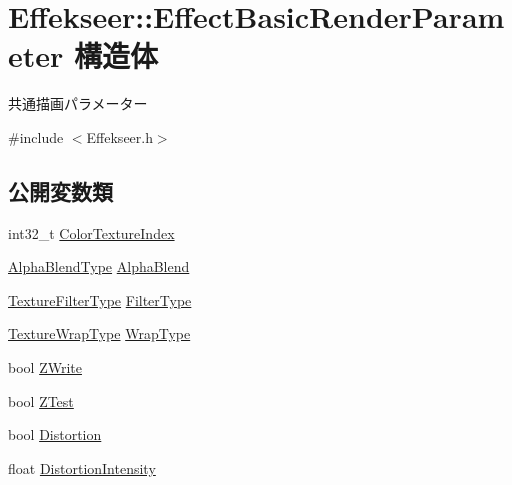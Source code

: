 \hypertarget{struct_effekseer_1_1_effect_basic_render_parameter}{}\section{Effekseer\+:\+:Effect\+Basic\+Render\+Parameter 構造体}
\label{struct_effekseer_1_1_effect_basic_render_parameter}


共通描画パラメーター  




{\ttfamily \#include $<$Effekseer.\+h$>$}

\subsection*{公開変数類}
\begin{DoxyCompactItemize}
\item 
int32\+\_\+t \mbox{\hyperlink{struct_effekseer_1_1_effect_basic_render_parameter_a28d3845ddf7e5255f5c6246ef001c265}{Color\+Texture\+Index}}
\item 
\mbox{\hyperlink{namespace_effekseer_a8c32fd5b7ec7feed73314b2ae8086949}{Alpha\+Blend\+Type}} \mbox{\hyperlink{struct_effekseer_1_1_effect_basic_render_parameter_a62dd6e32422dc32e2b883fa61e70067b}{Alpha\+Blend}}
\item 
\mbox{\hyperlink{namespace_effekseer_ae3518502cfcb4ec4991f13c0b3e4c6ee}{Texture\+Filter\+Type}} \mbox{\hyperlink{struct_effekseer_1_1_effect_basic_render_parameter_a9e28985009011c8822851a907f74e17c}{Filter\+Type}}
\item 
\mbox{\hyperlink{namespace_effekseer_a5320c83784602974b6278bf1a77b58a3}{Texture\+Wrap\+Type}} \mbox{\hyperlink{struct_effekseer_1_1_effect_basic_render_parameter_a6dd892388b41cdca1d9a2a1925e121ba}{Wrap\+Type}}
\item 
bool \mbox{\hyperlink{struct_effekseer_1_1_effect_basic_render_parameter_a5885cc84af9a418cff640d328d44f180}{Z\+Write}}
\item 
bool \mbox{\hyperlink{struct_effekseer_1_1_effect_basic_render_parameter_aa8b4ec30c13658639baf7663e8374999}{Z\+Test}}
\item 
bool \mbox{\hyperlink{struct_effekseer_1_1_effect_basic_render_parameter_a328281f04806165a3ed781871106c2ac}{Distortion}}
\item 
float \mbox{\hyperlink{struct_effekseer_1_1_effect_basic_render_parameter_a83b96e55145fa1858c9e51b5d86b3e92}{Distortion\+Intensity}}
\end{DoxyCompactItemize}



